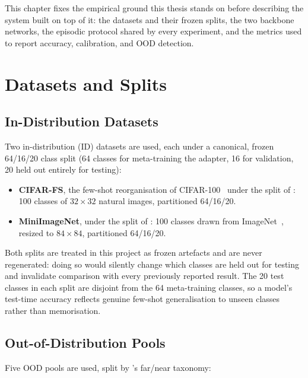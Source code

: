 \documentclass{iutbscthesis}
\begin{document}
This chapter fixes the empirical ground this thesis stands on before describing the system built on top of it: the datasets and their frozen splits, the two backbone networks, the episodic protocol shared by every experiment, and the metrics used to report accuracy, calibration, and OOD detection.

\section{Datasets and Splits}
\label{sec:proto-datasets}

\subsection{In-Distribution Datasets}

Two in-distribution (ID) datasets are used, each under a canonical, frozen 64/16/20 class split (64 classes for meta-training the adapter, 16 for validation, 20 held out entirely for testing):

\begin{itemize}
    \item \textbf{CIFAR-FS}, the few-shot reorganisation of CIFAR-100~\cite{krizhevsky2009cifar} under the split of \textcite{bertinetto2019r2d2}: 100 classes of $32{\times}32$ natural images, partitioned 64/16/20.
    \item \textbf{MiniImageNet}, under the split of \textcite{ravi2017optimization}: 100 classes drawn from ImageNet~\cite{deng2009imagenet}, resized to $84{\times}84$, partitioned 64/16/20.
\end{itemize}

Both splits are treated in this project as frozen artefacts and are never regenerated: doing so would silently change which classes are held out for testing and invalidate comparison with every previously reported result. The 20 test classes in each split are disjoint from the 64 meta-training classes, so a model's test-time accuracy reflects genuine few-shot generalisation to unseen classes rather than memorisation.

\subsection{Out-of-Distribution Pools}

Five OOD pools are used, split by \textcite{yang2022openood}'s far/near taxonomy:
\end{document}
